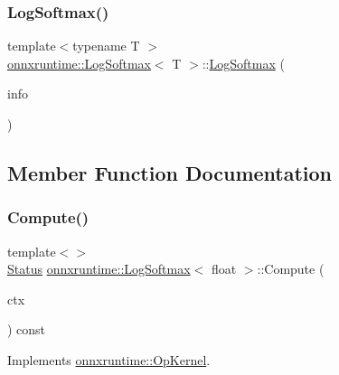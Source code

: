 \subsubsection{\texorpdfstring{Log\+Softmax()}{LogSoftmax()}}
{\footnotesize\ttfamily template$<$typename T $>$ \\
\mbox{\hyperlink{classonnxruntime_1_1LogSoftmax}{onnxruntime\+::\+Log\+Softmax}}$<$ T $>$\+::\mbox{\hyperlink{classonnxruntime_1_1LogSoftmax}{Log\+Softmax}} (\begin{DoxyParamCaption}\item[{const \mbox{\hyperlink{classonnxruntime_1_1OpKernelInfo}{Op\+Kernel\+Info}} \&}]{info }\end{DoxyParamCaption})\hspace{0.3cm}{\ttfamily [inline]}}



\subsection{Member Function Documentation}
\mbox{\label{classonnxruntime_1_1LogSoftmax_a4cc201ceb477725a9137cada2ee2ad89}} 
\subsubsection{\texorpdfstring{Compute()}{Compute()}\hspace{0.1cm}{\footnotesize\ttfamily [1/2]}}
{\footnotesize\ttfamily template$<$$>$ \\
\mbox{\hyperlink{classonnxruntime_1_1common_1_1Status}{Status}} \mbox{\hyperlink{classonnxruntime_1_1LogSoftmax}{onnxruntime\+::\+Log\+Softmax}}$<$ float $>$\+::Compute (\begin{DoxyParamCaption}\item[{\mbox{\hyperlink{classonnxruntime_1_1OpKernelContext}{Op\+Kernel\+Context}} $\ast$}]{ctx }\end{DoxyParamCaption}) const\hspace{0.3cm}{\ttfamily [virtual]}}



Implements \mbox{\hyperlink{classonnxruntime_1_1OpKernel_a9eca8656a78b1b3ab9d3351a12798650}{onnxruntime\+::\+Op\+Kernel}}.

\mbox{\label{classonnxruntime_1_1LogSoftmax_a869e5d589c9bca42347e93b85113c053}} 
